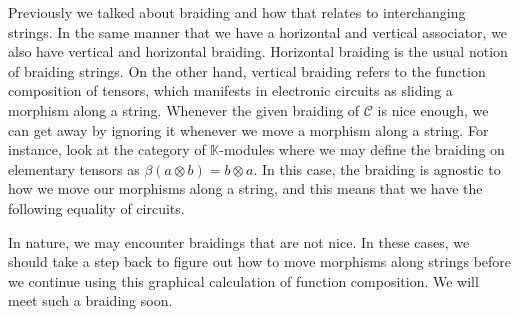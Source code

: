 \documentclass[../thesis.tex]{subfiles}
\begin{document}
            Previously we talked about braiding and how that relates to interchanging strings. In the same manner that we have a horizontal and vertical associator, we also have vertical and horizontal braiding. Horizontal braiding is the usual notion of braiding strings. On the other hand, vertical braiding refers to the function composition of tensors, which manifests in electronic circuits as sliding a morphism along a string. Whenever the given braiding of $\mathcal{C}$ is nice enough, we can get away by ignoring it whenever we move a morphism along a string. For instance, look at the category of $\mathbb{K}$-modules where we may define the braiding on elementary tensors as $\beta (a\otimes b) = b\otimes a$. In this case, the braiding is agnostic to how we move our morphisms along a string, and this means that we have the following equality of circuits.
            \begin{center}
            \end{center}

            In nature, we may encounter braidings that are not nice. In these cases, we should take a step back to figure out how to move morphisms along strings before we continue using this graphical calculation of function composition. We will meet such a braiding soon.
            
\end{document}
